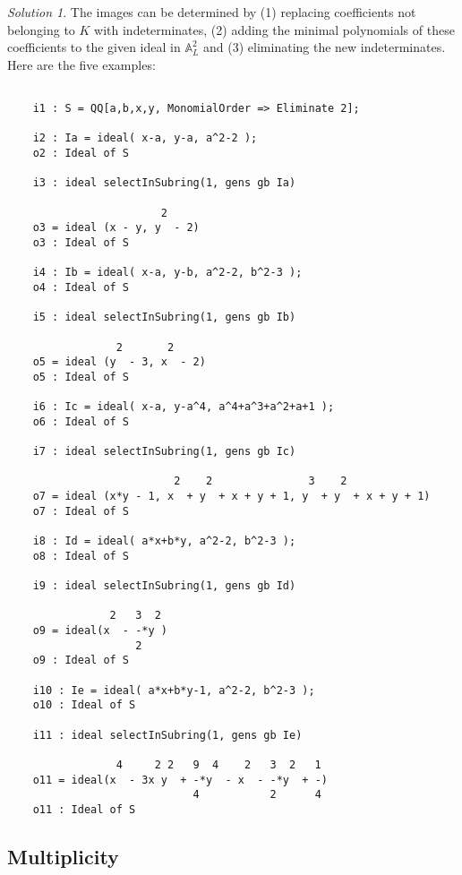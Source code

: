 \documentclass[12pt,noamsfonts]{amsart}
\def\AA{{\mathbb A}}
\theoremstyle{definition}
\theoremstyle{remark}
\newtheorem*{solution}{Solution}
\begin{document}
\begin{solution}
The images can be determined by (1) replacing coefficients
not belonging to $K$ with indeterminates, (2) adding the minimal
polynomials of these coefficients to the given ideal in $\AA_{L}^{2}$ and
(3) eliminating the new indeterminates. Here are the five examples:

{\scriptsize
\begin{verbatim}

    i1 : S = QQ[a,b,x,y, MonomialOrder => Eliminate 2];

    i2 : Ia = ideal( x-a, y-a, a^2-2 );
    o2 : Ideal of S

    i3 : ideal selectInSubring(1, gens gb Ia)

                        2
    o3 = ideal (x - y, y  - 2)
    o3 : Ideal of S

    i4 : Ib = ideal( x-a, y-b, a^2-2, b^2-3 );
    o4 : Ideal of S

    i5 : ideal selectInSubring(1, gens gb Ib)

                 2       2
    o5 = ideal (y  - 3, x  - 2)
    o5 : Ideal of S

    i6 : Ic = ideal( x-a, y-a^4, a^4+a^3+a^2+a+1 );
    o6 : Ideal of S
    
    i7 : ideal selectInSubring(1, gens gb Ic)
    
                          2    2               3    2
    o7 = ideal (x*y - 1, x  + y  + x + y + 1, y  + y  + x + y + 1)
    o7 : Ideal of S
    
    i8 : Id = ideal( a*x+b*y, a^2-2, b^2-3 );
    o8 : Ideal of S
    
    i9 : ideal selectInSubring(1, gens gb Id)
    
                2   3  2
    o9 = ideal(x  - -*y )
                    2
    o9 : Ideal of S
    
    i10 : Ie = ideal( a*x+b*y-1, a^2-2, b^2-3 );
    o10 : Ideal of S
    
    i11 : ideal selectInSubring(1, gens gb Ie)
    
                 4     2 2   9  4    2   3  2   1
    o11 = ideal(x  - 3x y  + -*y  - x  - -*y  + -)
                             4           2      4
    o11 : Ideal of S

\end{verbatim}}
\end{solution}

\subsection*{Multiplicity}
\end{document}
